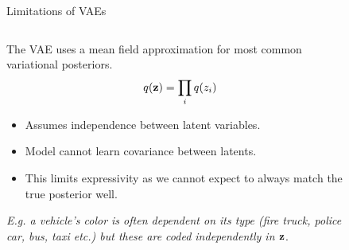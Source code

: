 \begin{frame}{Limitations of VAEs}
    \begin{columns}
        \begin{column}{0.8\textwidth}
            The VAE uses a mean field approximation for most common variational posteriors.
            \begin{equation}
                q({\mathbf{z}}) = \prod_{i} q(z_i)
            \end{equation}
            \begin{itemize}
                \item Assumes independence between latent variables.
                \item Model cannot learn covariance between latents.
                \item This limits expressivity as we cannot expect to always match the true posterior well.
            \end{itemize}
            {\small \textit{E.g. a vehicle's color is often dependent on its type (fire truck, police car, bus, taxi etc.) but these are coded independently in ${\mathbf{z}}$}.}
        \end{column}
        \begin{column}{0.2\textwidth}
            \begin{figure}[.5\textwidth]
            \end{figure}
        \end{column}
    \end{columns}
\end{frame}


